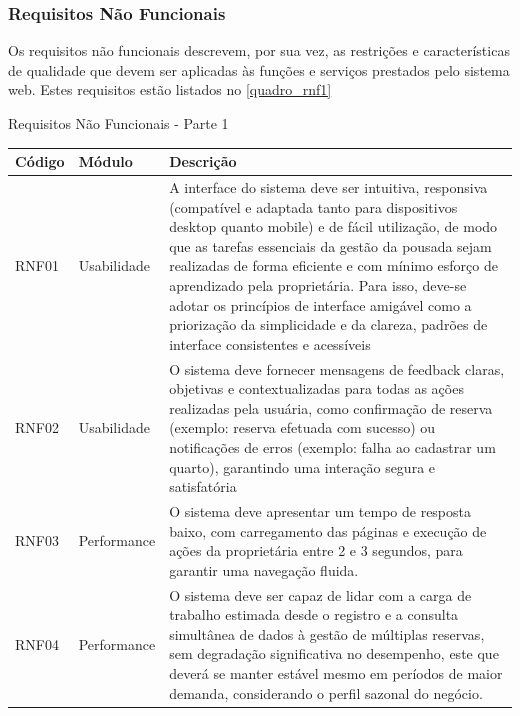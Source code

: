 \documentclass[
	12pt,				%
	openany,			%
	oneside,			%
	a4paper,			%
	english,			%
	french,				%
	spanish,			%
	brazil				%
	]{abntex2}
\begin{document}
\subsubsection{Requisitos Não Funcionais}
Os requisitos não funcionais descrevem, por sua vez, as restrições e características de qualidade que devem ser aplicadas às funções e serviços prestados pelo sistema web. Estes requisitos estão listados no \autoref{quadro_rnf1}
\begin{quadro}[H]
	\caption{\label{quadro_rnf1}Requisitos Não Funcionais - Parte 1}
	\begin{tabular}{|>{\centering\arraybackslash}m{2cm}|>{\centering\arraybackslash}m{4cm}|>{\raggedright\arraybackslash}m{8cm}|}
		\hline
		\textbf{Código} & \textbf{Módulo} & \textbf{Descrição} \\ \hline
		RNF01 & Usabilidade & A interface do sistema deve ser intuitiva, responsiva (compatível e adaptada tanto para dispositivos desktop quanto mobile)  e de fácil utilização, de modo que as tarefas essenciais da gestão da pousada sejam realizadas de forma eficiente e com mínimo esforço de aprendizado pela proprietária.  Para isso, deve-se adotar os princípios de interface amigável como a priorização da simplicidade e da clareza, padrões de interface consistentes e acessíveis
		\\ \hline
		RNF02 & Usabilidade & O sistema deve fornecer mensagens de feedback claras, objetivas e contextualizadas para  todas as ações  realizadas pela usuária, como confirmação de reserva (exemplo: reserva efetuada com sucesso) ou notificações de erros (exemplo: falha ao cadastrar um quarto), garantindo uma interação segura e  satisfatória \\ \hline
		RNF03 & Performance & O sistema deve apresentar um tempo de resposta baixo, com carregamento das páginas e execução de ações da proprietária entre 2 e 3 segundos, para garantir uma navegação fluida. \\ \hline
		RNF04 & Performance & O sistema deve ser capaz de lidar com a carga de trabalho estimada desde o registro e a consulta simultânea de dados à gestão de múltiplas reservas, sem degradação significativa no desempenho, este que deverá se manter estável mesmo em períodos de maior demanda, considerando o perfil sazonal do negócio. \\ \hline
	\end{tabular}
\end{quadro}
%
\end{document}
